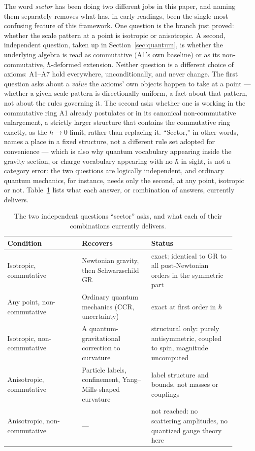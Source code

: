 \documentclass[pdflatex,sn-mathphys-num]{sn-jnl}
\theoremstyle{thmstyleone}
\theoremstyle{thmstylethree}
\theoremstyle{thmstyletwo}
\begin{document}
The word \emph{sector} has been doing two different jobs in this paper,
and naming them separately removes what has, in early readings, been the
single most confusing feature of this framework. One question is the
branch just proved: whether the scale pattern at a point is isotropic or
anisotropic. A second, independent question, taken up in
Section~\ref{sec:quantum}, is whether the underlying algebra is read as
commutative (A1's own baseline) or as its non-commutative,
$\hbar$-deformed extension. Neither question is a different choice of
axioms: A1–A7 hold everywhere, unconditionally, and never change. The
first question asks about a \emph{value} the axioms' own objects happen
to take at a point — whether a given scale pattern is directionally
uniform, a fact about that pattern, not about the rules governing it. The
second asks whether one is working in the commutative ring A1 already
postulates or in its canonical non-commutative enlargement, a strictly
larger structure that contains the commutative ring exactly, as the
$\hbar\to0$ limit, rather than replacing it. ``Sector,'' in other words,
names a place in a fixed structure, not a different rule set adopted for
convenience — which is also why quantum vocabulary appearing inside the
gravity section, or charge vocabulary appearing with no $\hbar$ in sight,
is not a category error: the two questions are logically independent, and
ordinary quantum mechanics, for instance, needs only the second, at any
point, isotropic or not. Table~\ref{tab:sectors} lists what each answer,
or combination of answers, currently delivers.

\begin{table}[htbp]
\centering
\small
\begin{tabular}{p{0.30\linewidth}p{0.28\linewidth}p{0.34\linewidth}}
\toprule
Condition & Recovers & Status \\
\midrule
Isotropic, commutative & Newtonian gravity, then Schwarzschild GR & exact; identical to GR to all post-Newtonian orders in the symmetric part \\
Any point, non-commutative & Ordinary quantum mechanics (CCR, uncertainty) & exact at first order in $\hbar$ \\
Isotropic, non-commutative & A quantum-gravitational correction to curvature & structural only: purely antisymmetric, coupled to spin, magnitude uncomputed \\
Anisotropic, commutative & Particle labels, confinement, Yang--Mills-shaped curvature & label structure and bounds, not masses or couplings \\
Anisotropic, non-commutative & --- & not reached: no scattering amplitudes, no quantized gauge theory here \\
\bottomrule
\end{tabular}
\caption{The two independent questions ``sector'' asks, and what each of
their combinations currently delivers.}
\label{tab:sectors}
\end{table}
\FloatBarrier
\end{document}
